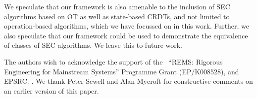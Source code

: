 \documentclass[acmlarge,review,anonymous]{acmart}
\begin{document}
We speculate that our framework is also amenable to the inclusion of SEC algorithms based on OT as well as state-based CRDTs, and not limited to operation-based algorithms, which we have focussed on in this work.
Further, we also speculate that our framework could be used to demonstrate the equivalence of classes of SEC algorithms.
We leave this to future work.

\begin{acks}
    The authors wish to acknowledge the support of the~ ``REMS: Rigorous Engineering for Mainstream Systems'' Programme Grant (EP/K008528),
     and EPSRC.
    .
We thank Peter Sewell and Alan Mycroft for constructive comments on an earlier version of this paper.

\end{acks}

{}
\end{document}
